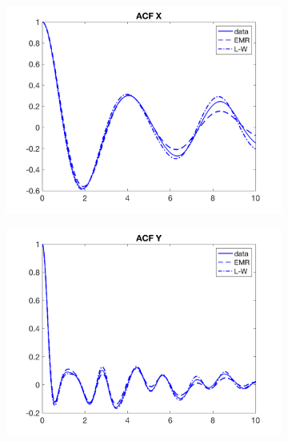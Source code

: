 \documentclass[12pt]{article}
\begin{document}
\begin{figure}[H]
	\centering
	\begin{subfigure}[b]{0.3\textwidth}
		\centering
		\includegraphics[width=\textwidth]{plots/l84l63/acfxl84025.png}
	\end{subfigure}
	\hfill
	\begin{subfigure}[b]{0.3\textwidth}
		\centering
		\includegraphics[width=\textwidth]{plots/l84l63/acfyl84025.png}
	\end{subfigure}
	\begin{subfigure}[b]{0.3\textwidth}
		\centering

\end{subfigure}
\end{figure}
\end{document}
